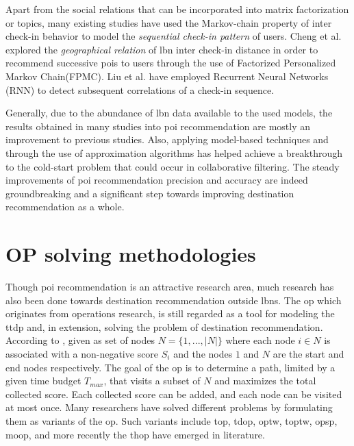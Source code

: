 Apart from the social relations that can be incorporated into matrix factorization or topics, many existing studies have used the Markov-chain property of inter check-in behavior to model the \textit{sequential check-in pattern} of users\parencite{Cheng2013WhereRecommendation, Zhao2016STELLAR:Recommendation, YangACoRR}. Cheng et al.\parencite{Cheng2013WhereRecommendation} explored the \textit{geographical relation} of \gls{lbn} inter check-in distance in order to recommend successive \glspl{poi} to users through the use of Factorized Personalized Markov Chain(FPMC). Liu et al.\parencite{LiuPredictingContexts} have employed Recurrent Neural Networks (RNN) to detect subsequent correlations of a check-in sequence. 

Generally, due to the abundance of \gls{lbn} data available to the used models, the results obtained in many studies into \gls{poi} recommendation are mostly an improvement to previous studies. Also,  applying model-based techniques and through the use of approximation algorithms has helped achieve a breakthrough to the cold-start problem that could occur in collaborative filtering. The steady improvements of \gls{poi} recommendation precision and accuracy are indeed groundbreaking and a significant step towards improving destination recommendation as a whole. 


\section{OP solving methodologies}
Though \gls{poi} recommendation is an attractive research area, much research has also been done towards destination recommendation outside \glspl{lbn}. The \Gls{op} which originates from operations research, is still regarded as a tool for modeling the \gls{ttdp} and, in extension, solving the problem of destination recommendation. According to \parencite{Vansteenwegen2011TheSurvey}, given as set of nodes $N = \{1,...,|N|\}$ where each node $i \in N$ is associated with a non-negative score $S_i$ and the nodes $1$ and $N$ are the start and end nodes respectively. The goal of the \gls{op} is to determine a path, limited by a given time budget $T_{max}$, that visits a subset of $N$ and maximizes the total collected score. Each collected score can be added, and each node can be visited at most once. Many researchers have solved different problems by formulating them as variants of the \gls{op}. Such variants include \gls{top}, \gls{tdop}, \gls{optw}, \gls{toptw}, \gls{opsp}, \gls{moop}, and more recently the \gls{thop} have emerged in literature. 

